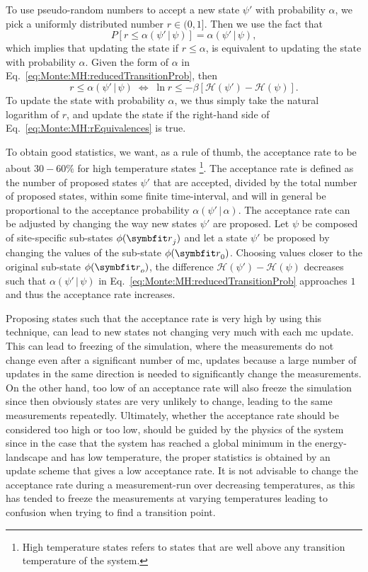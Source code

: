 To use pseudo-random numbers to accept a new state $\psi'$ with probability $\alpha$, we pick a uniformly distributed number $r\in(0,1]$. Then
we use the fact that
\begin{equation}
    \label{eq:Monte:MH:rProbability}
    P[r \leq \alpha(\psi'\,|\,\psi)] = \alpha(\psi'\,|\,\psi),
\end{equation}
which implies that updating the state if $r\leq\alpha$, is equivalent to updating the state with probability $\alpha$. Given the form of $\alpha$ in
Eq.~\eqref{eq:Monte:MH:reducedTransitionProb}, then
\begin{equation}
    \label{eq:Monte:MH:rEquivalences}
    r \leq \alpha(\psi'\,|\,\psi)\;\Leftrightarrow\;\ln r \leq -\beta[\mathcal{H}(\psi')-\mathcal{H}(\psi)].
\end{equation}
To update the state with probability $\alpha$, we thus simply take the natural logarithm of $r$, and update the state if the right-hand
side of Eq.~\eqref{eq:Monte:MH:rEquivalences} is true.

To obtain good statistics, we want, as a rule of thumb, the acceptance rate to be about $30-60\%$ for high temperature states%
\footnote{High temperature states refers to states that are well above any transition temperature of the system.}. %
The acceptance rate is defined as the
number of proposed states $\psi'$ that are accepted, divided by the total number of proposed states, within some finite time-interval, and will in general be proportional
to the acceptance probability $\alpha(\psi'\,|\,\alpha)$. The acceptance rate can be adjusted by changing the way
new states $\psi'$ are proposed. Let $\psi$ be composed of site-specific sub-states $\phi(\v{r}_j)$ and let a state $\psi'$ be proposed
by changing the values of the sub-state $\phi(\v{r}_0)$. Choosing values closer to the original sub-state $\phi(\v{r}_o)$, the difference
$\mathcal{H}(\psi')-\mathcal{H}(\psi)$ decreases such that $\alpha(\psi'\,|\,\psi)$ in
Eq.~\eqref{eq:Monte:MH:reducedTransitionProb} approaches $1$ and thus the acceptance rate increases.

Proposing states such that the acceptance rate is very high by using this technique, can lead to new states not changing very much with each \ac{mc} update. This
can lead to freezing of the simulation, where the measurements do not change even after a significant number of \ac{mc}, updates because
a large number of updates in the same direction is needed to significantly change the measurements. On the other hand, too low
of an acceptance rate will also freeze the simulation since then obviously states are very unlikely to change, leading to the same
measurements repeatedly. Ultimately, whether the acceptance rate should be considered too high or too low, should be guided by the physics of
the system since in the case that the system has reached a global minimum in the energy-landscape and has low temperature,
the proper statistics is obtained by
an update scheme that gives a low acceptance rate. It is not advisable to change the acceptance rate during a measurement-run over
decreasing temperatures, as this has tended to freeze the measurements at varying temperatures leading to confusion when trying to
find a transition point.

